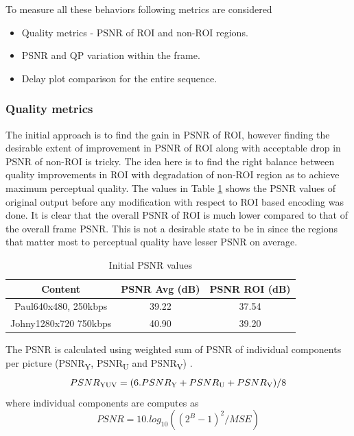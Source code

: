 \documentclass[11pt]{article} %
\begin{document}
To measure all these behaviors following metrics are considered
\begin{itemize}  
\item Quality metrics - PSNR of ROI and non-ROI regions.
\item PSNR and QP variation within the frame.
\item Delay plot comparison for the entire sequence.
\end{itemize}
\subsubsection{Quality metrics}
The initial approach is to find the gain in PSNR of ROI, however finding the desirable extent of improvement in PSNR of ROI along with acceptable drop in PSNR of non-ROI is tricky. The idea here is to find the right balance between quality improvements in ROI with degradation of non-ROI region as to achieve maximum perceptual quality. The values in Table \ref{InitPSNR1} shows the PSNR values of original output before any modification with respect to ROI based encoding was done. It is clear that the overall PSNR of ROI is much lower compared to that of the overall frame PSNR. This is not a desirable state to be in since the regions that matter most to perceptual quality have lesser PSNR on average.

\begin{table} [h!]
\centering
\begin{tabular}{ |c|c|c| }
 \hline
Content & PSNR Avg (dB) & PSNR ROI (dB) \\
 \hline 
 Paul640x480, 250kbps & 39.22 & 37.54 \\ 
 Johny1280x720 750kbps & 40.90 & 39.20 \\  
 \hline
\end{tabular}
 \caption{Initial PSNR values}
 \label{InitPSNR1}
\end{table}

The PSNR is calculated using weighted sum of PSNR of individual components per picture (PSNR\textsubscript{Y}, PSNR\textsubscript{U} and PSNR\textsubscript{V}) \cite{ComparingCodingEfficiency}.
\begin{equation}
\label{Eq:PSNR}
PSNR\textsubscript{YUV} = ( 6 . PSNR\textsubscript{Y} + PSNR\textsubscript{U} + PSNR\textsubscript{V}) / 8
\end{equation}
 where individual components are computes as
\begin{equation}
\label{Eq:PSNRDef}
PSNR = 10 . log_{10}((2^B - 1)^2 / MSE)
\end{equation}
\end{document}

